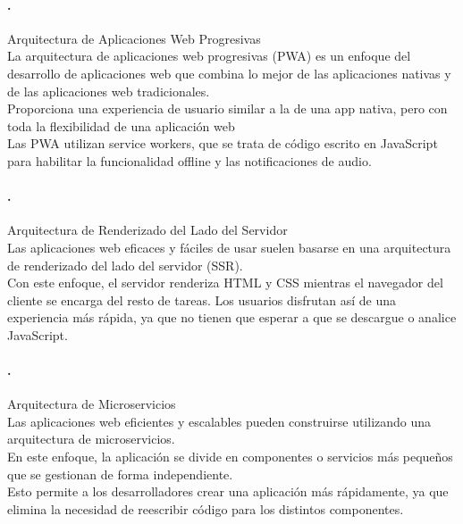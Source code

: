\documentclass[12pt,a4paper]{article}
\begin{document}
\paragraph{.}
Arquitectura de Aplicaciones Web Progresivas
\\
La arquitectura de aplicaciones web progresivas (PWA) es un enfoque del desarrollo de aplicaciones web que combina lo mejor de las aplicaciones nativas y de las aplicaciones web tradicionales.
\\
Proporciona una experiencia de usuario similar a la de una app nativa, pero con toda la flexibilidad de una aplicación web
\\
Las PWA utilizan service workers, que se trata de código escrito en JavaScript para habilitar la funcionalidad offline y las notificaciones de audio.
\paragraph{.}
Arquitectura de Renderizado del Lado del Servidor
\\
Las aplicaciones web eficaces y fáciles de usar suelen basarse en una arquitectura de renderizado del lado del servidor (SSR).
\\
Con este enfoque, el servidor renderiza HTML y CSS mientras el navegador del cliente se encarga del resto de tareas. Los usuarios disfrutan así de una experiencia más rápida, ya que no tienen que esperar a que se descargue o analice JavaScript.
\paragraph{.}
Arquitectura de Microservicios
\\
Las aplicaciones web eficientes y escalables pueden construirse utilizando una arquitectura de microservicios.
\\
En este enfoque, la aplicación se divide en componentes o servicios más pequeños que se gestionan de forma independiente.
\\
Esto permite a los desarrolladores crear una aplicación más rápidamente, ya que elimina la necesidad de reescribir código para los distintos componentes.
\end{document}
